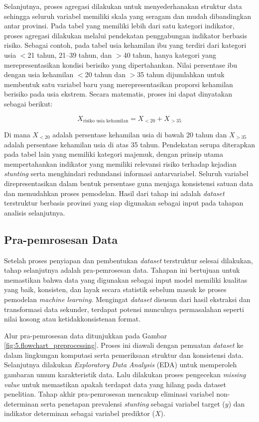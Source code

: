 Selanjutnya, proses agregasi dilakukan untuk menyederhanakan struktur data sehingga seluruh variabel memiliki skala yang seragam dan mudah dibandingkan antar provinsi. Pada tabel yang memiliki lebih dari satu kategori indikator, proses agregasi dilakukan melalui pendekatan penggabungan indikator berbasis risiko. Sebagai contoh, pada tabel usia kehamilan ibu yang terdiri dari kategori usia $<$21 tahun, 21--39 tahun, dan $>$40 tahun, hanya kategori yang merepresentasikan kondisi berisiko yang dipertahankan. Nilai persentase ibu dengan usia kehamilan $<$20 tahun dan $>$35 tahun dijumlahkan untuk membentuk satu variabel baru yang merepresentasikan proporsi kehamilan berisiko pada usia ekstrem. Secara matematis, proses ini dapat dinyatakan sebagai berikut:

\par\vspace{0.8cm} 
\[
   X_{\text{risiko usia kehamilan}} = X_{<20} + X_{>35}
\]
\par\vspace{0.8cm} 

Di mana $X_{<20}$ adalah persentase kehamilan usia di bawah 20 tahun dan $X_{>35}$ adalah persentase kehamilan usia di atas 35 tahun. Pendekatan serupa diterapkan pada tabel lain yang memiliki kategori majemuk, dengan prinsip utama mempertahankan indikator yang memiliki relevansi risiko terhadap kejadian \textit{stunting} serta menghindari redundansi informasi antarvariabel. Seluruh variabel direpresentasikan dalam bentuk persentase guna menjaga konsistensi satuan data dan memudahkan proses pemodelan. Hasil dari tahap ini adalah \textit{dataset} terstruktur berbasis provinsi yang siap digunakan sebagai input pada tahapan analisis selanjutnya.

\subsection{Pra-pemrosesan Data} \label{subsec:preprocessing}
Setelah proses penyiapan dan pembentukan \textit{dataset} terstruktur selesai dilakukan, tahap selanjutnya adalah pra-pemrosesan data. Tahapan ini bertujuan untuk memastikan bahwa data yang digunakan sebagai input model memiliki kualitas yang baik, konsisten, dan layak secara statistik sebelum masuk ke proses pemodelan \textit{machine learning}. Mengingat \textit{dataset} disusun dari hasil ekstraksi dan transformasi data sekunder, terdapat potensi munculnya permasalahan seperti nilai kosong atau ketidakkonsistenan format.

Alur pra-pemrosesan data ditunjukkan pada Gambar \ref{fig:5.flowchart_preprocessing}. Proses ini diawali dengan pemuatan \textit{dataset} ke dalam lingkungan komputasi serta pemeriksaan struktur dan konsistensi data. Selanjutnya dilakukan \textit{Exploratory Data Analysis} (EDA) untuk memperoleh gambaran umum karakteristik data. Lalu dilakukan proses pengecekan \textit{missing value} untuk memastikan apakah terdapat data yang hilang pada dataset penelitian. Tahap akhir pra-pemrosesan mencakup eliminasi variabel non-determinan serta penetapan prevalensi \textit{stunting} sebagai variabel target ($y$) dan indikator determinan sebagai variabel prediktor ($X$).

